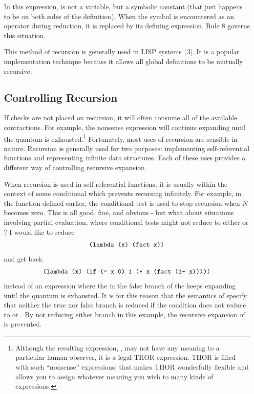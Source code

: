 In this expression,  is not a variable, but a symbolic constant (that
just happens to be on both sides of the definition). When the symbol
 is encountered as an operator during reduction, it is replaced by
its defining expression. Rule 8 governs this situation.

This method of recursion is generally used in LISP systems~[3]. It is a popular
implementation technique because it allows all global definitions to be mutually
recursive.

\subsection{Controlling Recursion}

If checks are not placed on recursion, it will often consume all of the
available contractions. For example, the nonsense expression  will
continue expanding until the quantum is exhausted.\footnote{Although the
resulting expression, , may not have any meaning to a
particular human observer, it is a legal THOR expression. THOR is filled with
such ``nonsense'' expressions; that makes THOR wonderfully flexible and allows
you to assign whatever meaning you wish to many kinds of expressions.}
Fortunately, most uses of recursion are sensible in nature. Recursion is
generally used for two purposes: implementing self-referential functions and
representing infinite data structures. Each of these uses provides a different
way of controlling recursive expansion.

When recursion is used in self-referential functions, it is usually within the
context of some conditional which prevents recursing infinitely. For example, in
the  function defined earlier, the conditional test  is
used to stop recursion when \(N\) becomes zero. This is all good, fine, and
obvious - but what about situations involving partial evaluation, where
conditional tests might not reduce to either  or ? I
would like to reduce
\[
\texttt{(lambda (x) (fact x))}
\]
and get back
\[
\texttt{(lambda (x) (if (= x 0) 1 (* x (fact (1- x)))))}
\]
instead of an expression where the  in the false branch of the
 keeps expanding until the quantum is exhausted. It is for this reason
that the semantics of  specify that neither the true nor false branch
is reduced if the condition does not reduce to  or . By
not reducing either branch in this example, the recursive expansion of
 is prevented.

